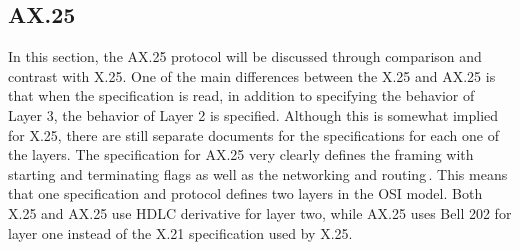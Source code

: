 \subsection{AX.25}
In this section, the AX.25 protocol will be discussed through comparison and contrast with X.25. One of the main differences between the X.25 and AX.25 is that when the specification is read, in addition to specifying the behavior of Layer 3, the behavior of Layer 2 is specified. Although this is somewhat implied for X.25, there are still separate documents for the specifications for each one of the layers. The specification for AX.25 very clearly defines the framing with starting and terminating flags as well as the networking and routing\,\cite{Beech1998}. This means that one specification and protocol defines two layers in the OSI model. Both X.25 and AX.25 use HDLC derivative for layer two, while AX.25 uses Bell 202 for layer one instead of the X.21 specification used by X.25.

